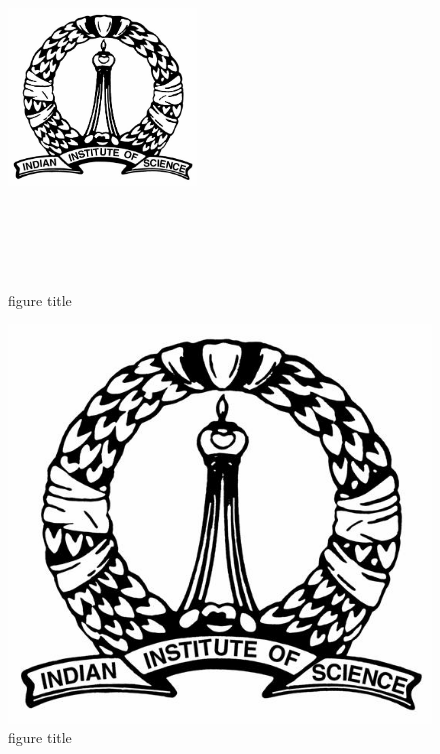 \documentclass[10pt,a4paper]{article}
\begin{document}
\begin{figure}
    \centering
    \includegraphics[width=5cm, height=10cm]{IISc_logo.jpg}
    \caption{figure title}
    \label{reference3}
\end{figure}

\begin{figure}
    \centering
    \includegraphics[angle=63]{IISc_logo.jpg}
    \caption{figure title}    
    \label{reference4}
\end{figure}
\end{document}
